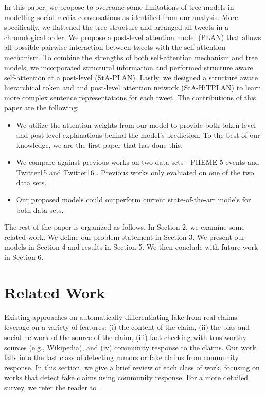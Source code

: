 \documentclass[letterpaper]{article} %
\begin{document}
In this paper, we propose to overcome some limitations of tree models in modelling social media conversations as identified from our analysis. More specifically, we flattened the tree structure and arranged all tweets in a chronological order. We propose a post-level attention model (PLAN) that allows all possible pairwise interaction between tweets with the self-attention mechanism. To combine the strengths of both self-attention mechanism and tree models, we incorporated structural information and performed structure aware self-attention at a post-level (StA-PLAN). Lastly, we designed a structure aware hierarchical token and and post-level attention network (StA-HiTPLAN) to learn more complex sentence representations for each tweet. \newline
\newline
The contributions of this paper are the following:
\begin{itemize}
    \item We utilize the attention weights from our model to provide both token-level and post-level explanations behind the model's prediction. To the best of our knowledge, we are the first paper that has done this.
    \item We compare against previous works on two data sets - PHEME 5 events \cite{kochkina_liakata_zubiaga_2018} and Twitter15 and Twitter16 \cite{ma17}. Previous works only evaluated on one of the two data sets.
    \item  Our proposed models could outperform current state-of-the-art models for both data sets.
\end{itemize}

The rest of the paper is organized as follows. In Section 2, we examine some related work. We define our problem statement in Section 3. We present our models in Section 4 and results in Section 5. We then conclude with future work in Section 6.

\section{Related Work}

Existing approaches on automatically differentiating fake from real claims leverage on a variety of features: (i) the  content of the claim, (ii) the bias and social network of the source of the claim,  (iii) fact checking with trustworthy sources (e.g., Wikipedia), and (iv) community response to the claims. Our work falls into the last class of detecting rumors or fake claims from community response. In this section, we give a brief review of each class of work, focusing on works that detect fake claims using community response. For a more detailed survey, we refer the reader to~\cite{sharma2019}.
\end{document}
